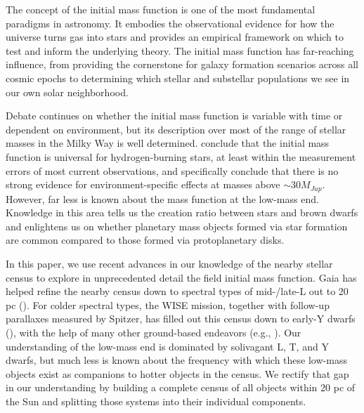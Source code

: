\documentclass[twocolumn,tighten,twocolappendix]{aastex631}
\begin{document}
The concept of the initial mass function is one of the most fundamental paradigms in astronomy. It embodies the observational evidence for how the universe turns gas into stars and provides an empirical framework on which to test and inform the underlying theory. The initial mass function has far-reaching influence, from providing the cornerstone for galaxy formation scenarios across all cosmic epochs to determining which stellar and substellar populations we see in our own solar neighborhood. 

Debate continues on whether the initial mass function is variable with time or dependent on environment, but its description over most of the range of stellar masses in the Milky Way is well determined. \cite{bastian2010} conclude that the initial mass function is universal for hydrogen-burning stars, at least within the measurement errors of most current observations, and \cite{andersen2008} specifically conclude that there is no strong evidence for environment-specific effects at masses above $\sim30M_{Jup}$. However, far less is known about the mass function at the low-mass end. Knowledge in this area tells us the creation ratio between stars and brown dwarfs and enlightens us on whether planetary mass objects formed via star formation are common compared to those formed via protoplanetary disks.
 
In this paper, we use recent advances in our knowledge of the nearby stellar census to explore in unprecedented detail the field initial mass function. Gaia has helped refine the nearby census down to spectral types of mid-/late-L out to 20 pc (\citealt{smart2020}). For colder spectral types, the WISE mission, together with follow-up parallaxes measured by Spitzer, has filled out this census down to early-Y dwarfs (\citealt{kirkpatrick2019,kirkpatrick2021}), with the help of many other ground-based endeavors (e.g., \citealt{best2021}). Our understanding of the low-mass end is dominated by solivagant L, T, and Y dwarfs, but much less is known about the frequency with which these low-mass objects exist as companions to hotter objects in the census. We rectify that gap in our understanding by building a complete census of all objects within 20 pc of the Sun and splitting those systems into their individual components.
\end{document}
